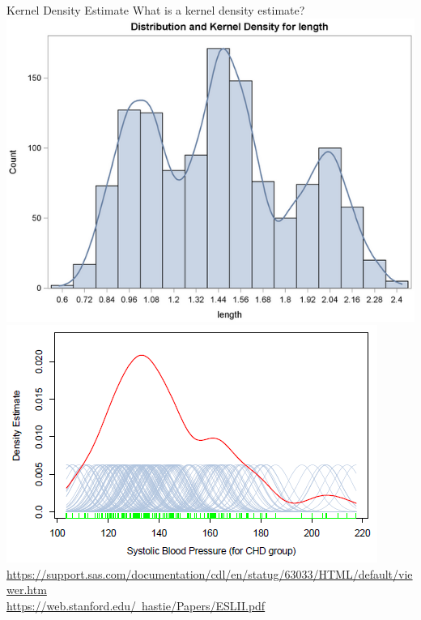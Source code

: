 \documentclass{beamer}
\begin{document}
\begin{frame}{Kernel Density Estimate}
\centering
\normalsize What is a kernel density estimate? \\
\vspace{30 pt}
\includegraphics[scale=0.3]{images/Histogram.png}
\hspace{20 pt}
\includegraphics[scale=0.45]{images/GaussianKernel.png} \\
{\tiny \href{https://support.sas.com/documentation/cdl/en/statug/63033/HTML/default/viewer.htm}{https://support.sas.com/documentation/cdl/en/statug/63033/HTML/default/viewer.htm}} \\
{\tiny \href{https://web.stanford.edu/~hastie/Papers/ESLII.pdf}{https://web.stanford.edu/~hastie/Papers/ESLII.pdf}}
\end{frame}
\end{document}
